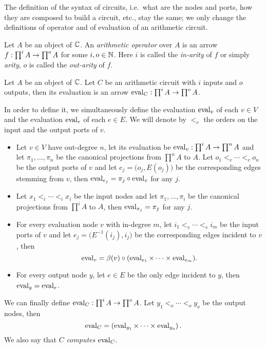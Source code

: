 The definition of the syntax of circuits, i.e.\ what are the nodes and
ports, how they are composed to build a circuit, etc., stay the same;
we only change the definitions of operator and of evaluation of an
arithmetic circuit.
  
\begin{definition}
  Let $A$ be an object of $\mathbb{C}$.  An
  \emph{arithmetic operator} over $A$ is an
  arrow $f:\prod^iA\rightarrow\prod^oA$ for some $i,o\in\mathbb{N}$. Here $i$ is
  called the \emph{in-arity} of $f$ or simply
  \emph{arity}, $o$ is called the \emph{out-arity} of $f$.
\end{definition}
  
\begin{definition}
  Let $A$ be an object of $\mathbb{C}$. Let $C$ be an arithmetic circuit with
  $i$ inputs and $o$ outputs, then its evaluation is an arrow
  $\operatorname{eval}_C:\prod^iA\rightarrow\prod^oA$.
  
  In order to define it, we simultaneously define the evaluation
  $\operatorname{eval}_v$ of each $v\in V$ and the evaluation $\operatorname{eval}_e$ of each
  $e\in E$. We will denote by $<_v$ the orders on the input and the
  output ports of $v$.
  \begin{itemize}
  \item Let $v\in V$ have out-degree $n$, let its evaluation be
    $\operatorname{eval}_v:\prod^iA\rightarrow\prod^nA$ and let $\pi_1,\ldots,\pi_n$ be the
    canonical projections from $\prod^nA$ to $A$. Let
    $o_1<_v\cdots<_vo_n$ be the output ports of $v$ and let
    $e_j=\bigl(o_j,E(o_j)\bigr)$ be the corresponding edges stemming
    from $v$, then $\operatorname{eval}_{e_j} = \pi_j\circ\operatorname{eval}_v$ for any $j$.
  \item Let $x_1<_i\cdots<_ix_i$ be the input nodes and let
    $\pi_1,\ldots,\pi_i$ be the canonical projections from $\prod^iA$
    to $A$, then $\operatorname{eval}_{x_j}=\pi_j$ for any $j$.
  \item For every evaluation node $v$ with in-degree $m$, let
    $i_1<_v\cdots<_vi_m$ be the input ports of $v$ and let
    $e_j=\bigl(E^{-1}(i_j),i_j\bigr)$ be the corresponding edges
    incident to $v$, then
    \begin{equation}
      \operatorname{eval}_v = \beta(v) \circ (\operatorname{eval}_{e_1}\times\cdots\times\operatorname{eval}_{e_m})
      \text{.}
    \end{equation}
  \item For every output node $y$, let $e\in E$ be the only edge
    incident to $y$, then $\operatorname{eval}_y=\operatorname{eval}_e$.
  \end{itemize}
    
  We can finally define $\operatorname{eval}_C:\prod^iA\rightarrow\prod^oA$. Let
  $y_1<_o\cdots<_oy_o$ be the output nodes, then
  \begin{equation}
    \operatorname{eval}_C = \left(\operatorname{eval}_{y_1}\times\cdots\times\operatorname{eval}_{y_o}\right)
    \text{.}
  \end{equation}
  We also say that $C$ \emph{computes} $\operatorname{eval}_C$.
\end{definition}
  
